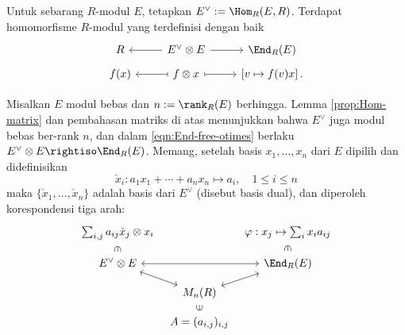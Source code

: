Untuk sebarang $R$-modul $E$, tetapkan $E^\vee := \Hom_R(E, R)$. Terdapat homomorfisme $R$-modul yang terdefinisi dengan baik
\begin{equation}\label{eqn:End-free-otimes}\begin{tikzcd}[row sep=tiny]
	R & \arrow[l] E^\vee \otimes E \arrow[r] & \End_R(E) \\
	f(x) & f \otimes x \arrow[mapsto, r] \arrow[mapsto, l] & \left[ v \mapsto f(v) x \right].
\end{tikzcd}\end{equation}

Misalkan $E$ modul bebas dan $n := \rank_R(E)$ berhingga. Lemma \ref{prop:Hom-matrix} dan pembahasan matriks di atas menunjukkan bahwa $E^\vee$ juga modul bebas ber-rank $n$, dan dalam \eqref{eqn:End-free-otimes} berlaku $E^\vee \otimes E \rightiso \End_R(E)$. Memang, setelah basis $x_1, \ldots, x_n$ dari $E$ dipilih dan didefinisikan
\[ \check{x}_i: a_1 x_1 + \cdots + a_n x_n \longmapsto a_i, \quad 1 \leq i \leq n \]
maka $\{\check{x}_1, \ldots, \check{x}_n\}$ adalah basis dari $E^\vee$ (disebut basis dual), dan diperoleh korespondensi tiga arah:
\[\begin{tikzcd}[row sep=small, column sep=tiny]
	\sum_{i,j} a_{ij} \check{x}_j \otimes x_i \arrow[phantom, d, sloped, "\in" description] & & \varphi: x_j \mapsto \sum_i x_i a_{ij} \arrow[phantom, d, sloped, "\in" description] \\
	E^\vee \otimes E \arrow[leftrightarrow, rr]  & & \End_R(E) \\
	& M_n(R) \arrow[leftrightarrow,lu] \arrow[leftrightarrow, ru] & \\
	& A = (a_{i,j})_{i,j} \arrow[phantom, u, sloped, "\in" description] &
\end{tikzcd} \]

